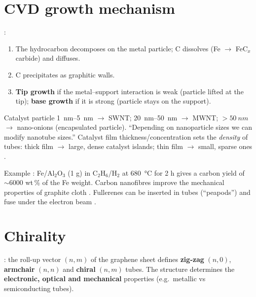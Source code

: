 \section{CVD growth mechanism}
:
\begin{enumerate}
  \item The hydrocarbon decomposes on the metal particle; C dissolves (Fe $\to$ FeC$_x$ carbide) and diffuses.
  \item C precipitates as graphitic walls.
  \item \textbf{Tip growth} if the metal--support interaction is weak (particle lifted at the tip);
        \textbf{base growth} if it is strong (particle stays on the support).
\end{enumerate}
\begin{keybox}
Catalyst particle \SIrange{1}{5}{nm} $\to$ SWNT; \SIrange{20}{50}{nm} $\to$ MWNT; $>\SI{50}{nm}$ $\to$ nano-onions
(encapsulated particle). ``Depending on nanoparticle sizes we can modify nanotube sizes.''
Catalyst film thickness/concentration sets the \emph{density} of tubes: thick film $\to$ large, dense catalyst
islands; thin film $\to$ small, sparse ones .
\end{keybox}
Example : Fe/Al$_2$O$_3$ (1 g) in C$_2$H$_6$/H$_2$ at \SI{680}{\celsius} for 2 h gives a carbon yield of
$\sim6000$ wt\,\% of the Fe weight. Carbon nanofibres improve the mechanical properties of graphite cloth .
Fullerenes can be inserted in tubes (``peapods'') and fuse under the electron beam .

\section{Chirality}
: the roll-up vector $(n,m)$ of the graphene sheet defines \textbf{zig-zag} $(n,0)$, \textbf{armchair}
$(n,n)$ and \textbf{chiral} $(n,m)$ tubes. The structure determines the \textbf{electronic, optical and mechanical}
properties (e.g.\ metallic vs semiconducting tubes).
